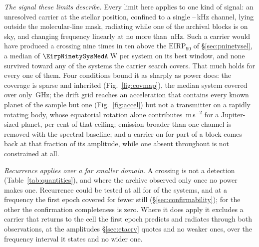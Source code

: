 \noindent\emph{The signal these limits describe.} Every limit here applies to
one kind of signal: an unresolved carrier at the stellar position, confined to
a single \ChanLoA--\ChanHiA\,kHz channel, lying outside the molecular-line
mask, radiating while one of the archival blocks is on sky, and changing
frequency linearly at no more than \DriftCeilLo\,nHz. Such a carrier would
have produced a crossing nine times in ten above the $\mathrm{EIRP}_{90}$ of
\S\ref{sec:pninetysel}, a median of $\EirpNinetySysMedA$\,W per system on its
best window, and none survived toward any of the \NSysClassA{} systems the
carrier search covers. That much holds for every one of them. Four conditions
bound it as sharply as power does: the coverage is sparse and
inherited (Fig.~\ref{fig:covmap}), the median system covered over only
\SysUnionAMed\,GHz; the drift grid reaches an acceleration that contains every
known planet of the sample but one (Fig.~\ref{fig:accel}) but not a
transmitter on a rapidly rotating body, whose equatorial rotation alone
contributes \AccelJupRot\,m\,s$^{-2}$ for a Jupiter-sized planet,
\AccelJupPct{} per cent of that ceiling; emission broader than one channel is
removed with the spectral baseline; and a carrier on for part of a block comes
back at that fraction of its amplitude, while one absent throughout is not
constrained at all.

\noindent\emph{Recurrence applies over a far smaller domain.} A
crossing is not a detection (Table~\ref{tab:quantities}), and where the archive
observed only once no power makes one. Recurrence could be tested at all for
\ScSysIndep{} of the \NSysClassA{} systems, and at a frequency the first
epoch covered for fewer still (\S\ref{sec:confirmability}); for the
other \ScSysNoConf{} the confirmation completeness is zero. Where it does
apply it excludes a carrier that
returns to the cell the first epoch predicts and radiates through both
observations, at the amplitudes \S\ref{sec:etacrv} quotes and no weaker ones,
over the frequency interval it states and no wider one.

